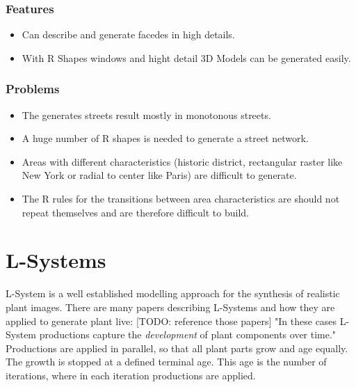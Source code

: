 \documentclass[11pt, a4paper]{report}
\begin{document}
\subsubsection{Features}
    \begin{itemize}
        \item Can describe and generate facedes in high details.
        \item With R Shapes windows and hight detail 3D Models can be generated easily.
    \end{itemize}

\subsubsection{Problems}
    \begin{itemize}
        \item The generates streets result mostly in monotonous streets. 
        \item A huge number of R shapes is needed to generate a street network.
        \item Areas with different characteristics (historic district, rectangular raster like New York or radial to center like Paris) are difficult to generate.
        \item The R rules for the transitions between area characteristics are should not repeat themselves and are therefore difficult to build.
    \end{itemize}

\pagebreak
\section{L-Systems}

L-System is a well established modelling approach for the synthesis of realistic plant images. There are many papers describing L-Systems and how they are applied to generate plant live: [TODO: reference those papers] "In these cases L-System productions capture the \textit{development} of plant components over time." \citep{PrusinkiewiczEtAl:2001} Productions are applied in parallel, so that all plant parts grow and age equally. The growth is stopped at a defined terminal age. This age is the number of iterations, where in each iteration productions are applied.
\end{document}
